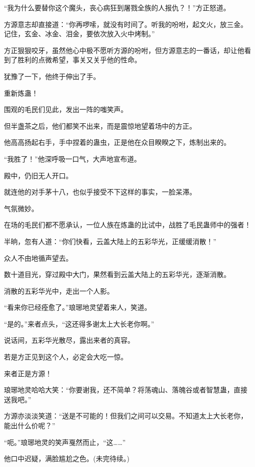 \begin{this_body}
“我为什么要替你这个魔头，丧心病狂到屠戮全族的人报仇？！”方正怒道。

方源意志却直接道：“你再啰嗦，就没有时间了。听我的吩咐，起文火，放三金。记住，玄金、冰金、泪金，要依次放入火中烤制。”

方正狠狠咬牙，虽然他心中极不愿听方源的吩咐，但方源意志的一番话，却让他看到了胜利的点微希望，事关又关乎他的性命。

犹豫了一下，他终于伸出了手。

重新炼蛊！

围观的毛民们见此，发出一阵的嗤笑声。

但半盏茶之后，他们都笑不出来，而是震惊地望着场中的方正。

他高高扬起右手，手中捏着的蛊虫，正是他在众目睽睽之下，炼制出来的。

“我胜了！”他深呼吸一口气，大声地宣布道。

殿中，仍旧无人开口。

就连他的对手茅十八，也似乎接受不下这样的事实，一脸呆滞。

气氛微妙。

在场的毛民们都不愿承认，一位人族在炼蛊的比试中，战胜了毛民蛊师中的强者！

半晌，忽有人道：“你们快看，云盖大陆上的五彩华光，正缓缓消散！”

众人不由地循声望去。

数十道目光，穿过殿中大门，果然看到云盖大陆上的五彩华光，逐渐消散。

消散的五彩华光中，走出一个人影。

“看来你已经痊愈了。”琅琊地灵望着来人，笑道。

“是的。”来者点头，“这还得多谢太上大长老你啊。”

说话间，五彩华光散尽，露出来者的真容。

若是方正见到这个人，必定会大吃一惊。

来者正是方源！

琅琊地灵哈哈大笑：“你要谢我，还不简单？将荡魂山、落魄谷或者智慧蛊，直接送我吧。”

方源亦淡淡笑道：“送是不可能的！但我们之间可以交易。不知道太上大长老你，能出什么价呢？”

“呃。”琅琊地灵的笑声戛然而止，“这……”

他口中迟疑，满脸尴尬之色。(未完待续。)

\end{this_body}

